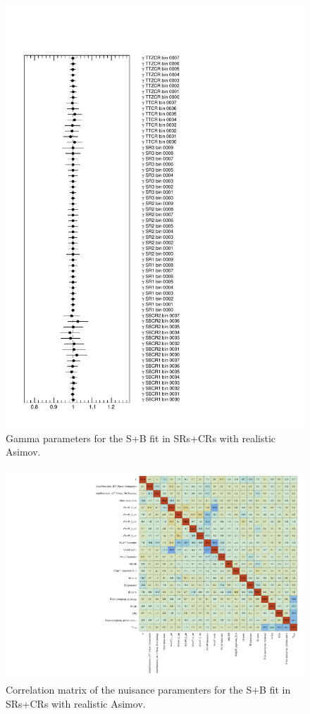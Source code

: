 \begin{figure}[htbp]
	\centering
	\includegraphics[width=.85\textwidth]{Appendices/AP8/figures/SPLUSB_CRSR_UsingSMTFullSys/Gammas}
	\caption{Gamma parameters for the S+B \tZc fit in SRs+CRs with realistic Asimov.}%
	\label{fig:stat_smt:tzc:splusb:crsr:gamma}
\end{figure}

\begin{figure}[htbp]
	\centering
	\includegraphics[width=.95\textwidth]{Appendices/AP8/figures/SPLUSB_CRSR_UsingSMTFullSys/CorrMatrix}
	\caption{Correlation matrix of the nuisance paramenters for the S+B \tZc fit in SRs+CRs with realistic Asimov.}%
	\label{fig:stat_smt:tzc:splusb:crsr:corrmatrix}
\end{figure}


